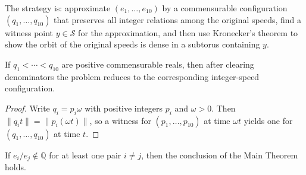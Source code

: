 \documentclass[12pt]{article}
\begin{document}
The strategy is: approximate $(e_1,\ldots,e_{10})$ by a commensurable configuration
$(q_1,\ldots,q_{10})$ that preserves all integer relations among the original speeds,
find a witness point $y\in\mathcal{S}$ for the approximation, and then use Kronecker's
theorem to show the orbit of the original speeds is dense in a subtorus containing $y$.

\begin{lemma}\label{l:C1}
If $q_1<\cdots<q_{10}$ are positive commensurable reals, then after clearing denominators
the problem reduces to the corresponding integer-speed configuration.
\end{lemma}

\begin{proof}
Write $q_i=p_i\omega$ with positive integers $p_i$ and $\omega>0$. Then
$\|q_it\|=\|p_i(\omega t)\|$, so a witness for $(p_1,\ldots,p_{10})$ at time $\omega t$
yields one for $(q_1,\ldots,q_{10})$ at time $t$.
\end{proof}

\begin{proposition}\label{p:C2}
If $e_i/e_j\notin\mathbb{Q}$ for at least one pair $i\ne j$, then the conclusion of the
Main Theorem holds.
\end{proposition}
\end{document}
